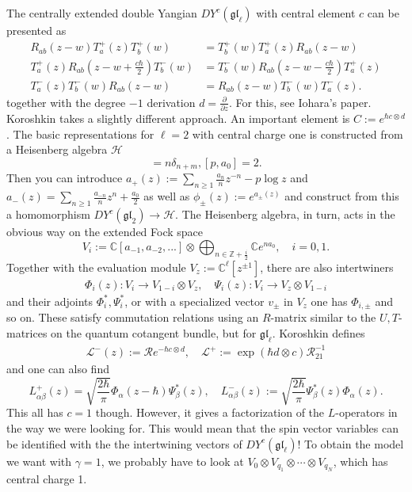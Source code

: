 \documentclass[11pt]{report}
\theoremstyle{definition}
\theoremstyle{remark}
\theoremstyle{remark}
\newcommand{\Z}{\mathbb{Z}}
\newcommand{\C}{\mathbb{C}}
\begin{document}
The centrally extended double Yangian $DY^c(\mathfrak{gl}_\ell)$ with central element $c$ can be presented as
\begin{align*}
R_{ab}(z-w) T_a^+(z) T_b^+(w) &= T_b^+(w) T_a^+(z) R_{ab}(z-w) \\
T_a^+(z) R_{ab}(z-w+\tfrac{c\hbar}{2}) T_b^-(w) &= T_b^-(w) R_{ab}(z-w-\tfrac{c\hbar}{2}) T_a^+(z) \\
T_a^-(z) T_b^-(w) R_{ab}(z-w) &= R_{ab}(z-w) T_b^-(w) T_a^-(z).
\end{align*}
together with the degree $-1$ derivation $d = \frac{\partial}{\partial z}$. For this, see Iohara's paper. Koroshkin takes a slightly different approach. An important element is $C := e^{\hbar c \otimes d}$. The basic representations for $\ell=2$ with central charge one is constructed from a Heisenberg algebra $\mathcal{H}$
\begin{equation*}
[a_n,a_m] = n \delta_{n+m}, [p,a_0] = 2.
\end{equation*}
Then you can introduce $a_+(z) := \sum_{n \geq 1} \frac{a_n}{n} z^{-n}-p\log z$ and $a_-(z) = \sum_{n \geq 1} \frac{a_{-n}}{n} z^n + \frac{a_0}{2}$ as well as $\phi_\pm(z) := e^{a_\pm(z)}$ and construct from this a homomorphism $DY^c(\mathfrak{gl}_2) \to \mathcal{H}$. The Heisenberg algebra, in turn, acts in the obvious way on the extended Fock space
\begin{equation*}
V_i := \C[a_{-1},a_{-2},...] \otimes \bigoplus_{n \in \Z + \frac{i}{2}} \C e^{na_0}, \quad i=0,1.
\end{equation*}
Together with the evaluation module $V_z := \C^\ell[z^{\pm 1}]$, there are also intertwiners
\begin{align*}
\Phi_i(z): V_i \to V_{1-i} \otimes V_z, \quad \Psi_i(z): V_i \to V_z \otimes V_{1-i}
\end{align*}
and their adjoints $\Phi_i^*,\Psi_i^*$, or with a specialized vector $v_\pm$ in $V_z$ one has $\Phi_{i,\pm}$ and so on. These satisfy commutation relations using an $R$-matrix similar to the $U,T$-matrices on the quantum cotangent bundle, but for $\mathfrak{gl}_\ell$. Koroshkin defines
\begin{align*}
\mathcal{L}^-(z) := \mathcal{R} e^{-\hbar c \otimes d}, \quad \mathcal{L}^+ := \exp(\hbar d \otimes c) \mathcal{R}_{21}^{-1}
\end{align*}
and one can also find
\begin{equation*}
L_{\alpha\beta}^+(z) = \sqrt{\frac{2\hbar}{\pi}} \Phi_\alpha(z-\hbar) \Psi_\beta^*(z), \quad L_{\alpha\beta}^-(z) := \sqrt{\frac{2\hbar}{\pi}} \Psi_\beta^*(z) \Phi_\alpha(z).
\end{equation*}
This all has $c=1$ though. However, it gives a factorization of the $L$-operators in the way we were looking for. This would mean that the spin vector variables can be identified with the the intertwining vectors of $DY^c(\mathfrak{gl}_\ell)$! To obtain the model we want with $\gamma=1$, we probably have to look at $V_0 \otimes V_{q_1} \otimes \cdots \otimes V_{q_N}$, which has central charge 1.
\end{document}
